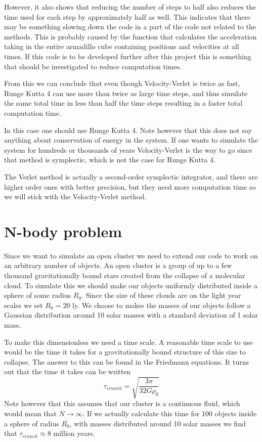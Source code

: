 \documentclass{aa}   %
\begin{document}
However, it also shows that reducing the number of steps to half also reduces the time used for each step by approximately half as well. This indicates that there may be something slowing down the code in a part of the code not related to the methods. This is probably caused by the function that calculates the acceleration taking in the entire armadillo cube containing positions and velocities at all times. If this code is to be developed further after this project this is something that should be investigated to reduce computation times.

From this we can conclude that even though Velocity-Verlet is twice as fast, Runge Kutta 4 can use more than twice as large time steps, and thus simulate the same total time in less than half the time steps resulting in a faster total computation time. 

In this case one should use Runge Kutta 4. Note however that this does not say anything about conservation of energy in the system. If one wants to simulate the system for hundreds or thousands of years Velocity-Verlet is the way to go since that method is symplectic, which is not the case for Runge Kutta 4. 

The Verlet method is actually a second-order symplectic integrator, and there are higher order ones with better precision, but they need more computation time so we will stick with the Velocity-Verlet method.
\section{N-body problem}    \label{sec:N-boy}
Since we want to simulate an open cluster we need to extend our code to work on an arbitrary number of objects.
An open cluster is a group of up to a few thousand gravitationally bound stars created from the collapse of a molecular cloud.
To simulate this we should make our objects uniformly distributed inside a sphere of some radius $R_0$. Since the size of these clouds are on the light year scales we set $R_0 = 20$ ly. We choose to makes the masses of our objects follow a Gaussian distribution around 10 solar masses with a standard deviation of 1 solar mass. 

To make this dimensionless we need a time scale. A reasonable time scale to use would be the time it takes for a gravitationally bound structure of this size to collapse. The answer to this can be found in the Friedmann equations.
It turns out that the time it takes can be written
\begin{equation}
 \tau_{crunch} = \sqrt{\frac{3\pi}{32G\rho_0}}
\end{equation}
Note however that this assumes that our cluster is a continuous fluid, which would mean that $N \rightarrow \infty$.
If we actually calculate this time for 100 objects inside a sphere of radius $R_0$, with masses distributed around 10 solar masses we find that $\tau_{crunch} \approx 8$ million years.
\end{document}
